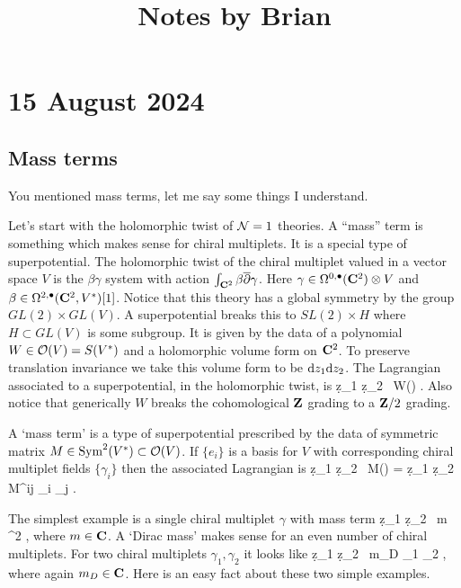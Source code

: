 \documentclass[11pt]{amsart}
\begin{document}
 

\title{Notes by Brian}

\maketitle


\section{15 August 2024}

\subsection{Mass terms}

You mentioned mass terms, let me say some things I understand.

Let's start with the holomorphic twist of $\mathcal N=1$ theories.
A ``mass'' term is something which makes sense for chiral multiplets.
It is a special type of superpotential.
The holomorphic twist of the chiral multiplet valued in a vector space $V$ is the $\beta\gamma$ system with action $\int_{\mathbf{C}^2} \beta \overline{\partial} \gamma$.
Here $\gamma \in \Omega^{0,\bullet}(\mathbf{C}^2) \otimes V$ and $\beta \in \Omega^{2,\bullet}(\mathbf{C}^2, V^*)[1]$.
Notice that this theory has a global symmetry by the group $GL(2) \times GL(V)$.
A superpotential breaks this to $SL(2) \times H$ where $H \subset GL(V)$ is some subgroup.
It is given by the data of a polynomial $W \in \mathcal O(V) = S (V^*)$ and a holomorphic volume form on $\mathbf{C}^2$. To preserve translation invariance we take this volume form to be ${\rm d} z_1 {\rm d} z_2$.
The Lagrangian associated to a superpotential, in the holomorphic twist, is
\beqn
\int \d z_1 \d z_2 \, W(\gamma)  .
\eeqn
Also notice that generically $W$ breaks the cohomological $\mathbf{Z}$ grading to a $\mathbf{Z}/2$ grading.

A `mass term' is a type of superpotential prescribed by the data of symmetric matrix $M \in \operatorname{Sym}^2(V^*) \subset \mathcal O(V)$.
If $\{e_i\}$ is a basis for $V$ with corresponding chiral multiplet fields $\{\gamma_i\}$ then the associated Lagrangian is
\beqn\label{eqn:lagmass}
\int \d z_1 \d z_2 \, M(\gamma) = \int \d z_1 \d z_2 \, M^{ij} \gamma_i \gamma_j .
\eeqn

The simplest example is a single chiral multiplet $\gamma$ with mass term
\beqn\label{eqn:mass1}
 \int \d z_1 \d z_2 \, m \gamma^2 ,
\eeqn
where $m \in \mathbf{C}$.
A `Dirac mass' makes sense for an even number of chiral multiplets.
For two chiral multiplets $\gamma_1, \gamma_2$ it looks like 
\beqn\label{eqn:mass2}
\int \d z_1 \d z_2 \,  m_{D} \gamma_1 \gamma_2 ,
\eeqn
where again $m_D \in \mathbf{C}$.
Here is an easy fact about these two simple examples.
\end{document}
